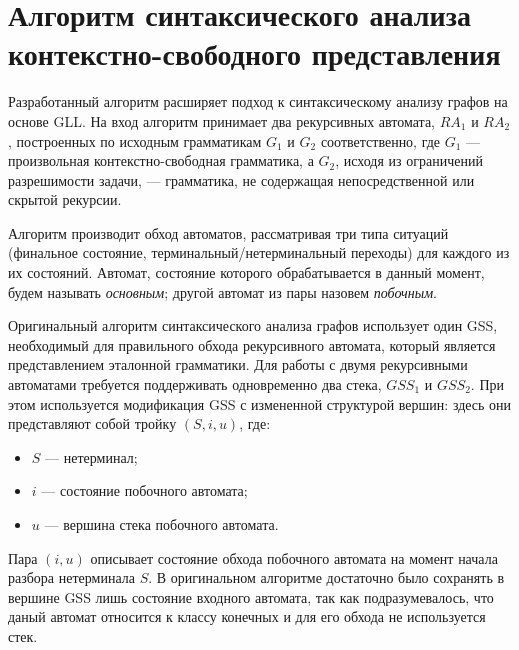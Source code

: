 \section{Алгоритм синтаксического анализа \\ контекстно-свободного представления}

Разработанный алгоритм расширяет подход к синтаксическому анализу графов на основе GLL. На вход алгоритм принимает два рекурсивных автомата, $RA_1$ и $RA_2$, построенных по исходным грамматикам $G_1$ и $G_2$ соответственно, где $G_1$ --- произвольная контекстно-свободная грамматика, а $G_2$, исходя из ограничений разрешимости задачи, --- грамматика, не содержащая непосредственной или скрытой рекурсии.

Алгоритм производит обход автоматов, рассматривая три типа ситуаций (финальное состояние, терминальный/нетерминальный переходы) для каждого из их состояний. Автомат, состояние которого обрабатывается в данный момент, будем называть \textit{основным}; другой автомат из пары назовем \textit{побочным}.

Оригинальный алгоритм синтаксического анализа графов использует один GSS, необходимый для правильного обхода рекурсивного автомата, который является представлением эталонной грамматики. Для работы с двумя рекурсивными автоматами требуется поддерживать одновременно два стека, $GSS_1$ и $GSS_2$. При этом используется модификация GSS с измененной структурой вершин: здесь они представляют собой тройку $(S, i, u)$, где: 
\begin{itemize}
	\setlength\itemsep{0em}
	\item $S$ --- нетерминал;
	\item $i$ --- состояние побочного автомата;
	\item $u$ --- вершина стека побочного автомата.
\end{itemize}
Пара $(i, u)$ описывает состояние обхода побочного автомата на момент начала разбора нетерминала $S$. В оригинальном алгоритме достаточно было сохранять в вершине GSS лишь состояние входного автомата, так как подразумевалось, что даный автомат относится к классу конечных и для его обхода не используется стек.

